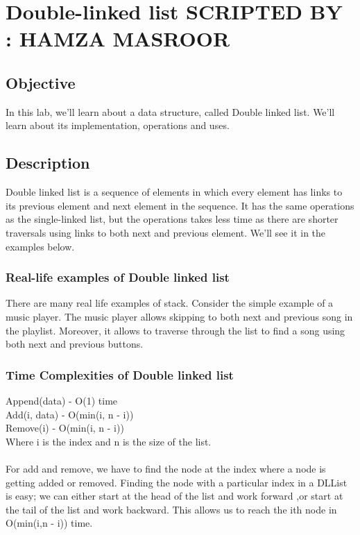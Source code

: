 \documentclass[11pt,fleqn]{book} %
\begin{document}
\newpage
{} %
\chapter{Double-linked list \hspace{40mm} {\textsc{\small SCRIPTED BY : HAMZA MASROOR}}}
\section{Objective}
In this lab, we'll learn about a data structure, called Double linked list. We'll learn about its implementation, operations and uses.
\section{Description}
Double linked list is a sequence of elements in which every element has links to its previous element and next element in the sequence.
It has the same operations as the single-linked list, but the operations takes less time as there are shorter traversals using links to both next and previous element. We'll see it in the examples below.

\subsection{Real-life examples of Double linked list}
There are many real life examples of stack. Consider the simple example of a music player. The music player allows skipping to both next and previous song in the playlist. Moreover, it allows to traverse through the list to find a song using both next and previous buttons.

\subsection{Time Complexities of Double linked list}
Append(data) - O(1) time \\
Add(i, data) - O(min(i, n - i))\\
Remove(i) - O(min(i, n - i))\\ 
Where i is the index and n is the size of the list.\\ \\
For add and remove, we have to find the node at the index where a node is getting added or removed. Finding the node with a particular index in a DLList is easy; we can either start at the head of the list and work forward ,or start at the tail of the list and work backward. This allows us to reach the ith node in O(min(i,n - i)) time.
\end{document}
